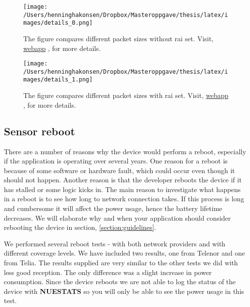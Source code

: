 \documentclass[USenglish]{ifimaster}  %
\begin{document}
\begin{figure}[H]
  \centering
  \texttt{[image: /Users/henninghakonsen/Dropbox/Masteroppgave/thesis/latex/images/details\_0.png]}
  \caption[Short-term test - packet size comparison without \acrshort{rai}]{The figure compares different packet sizes without \acrshort{rai} set. Visit, \href{http://158.39.77.97:9000/\#/results/UiO\_TELIA\_long\_term\_2018-03-22\_0x0\_30\_20}{webapp} \cite{online:result7}, for more details.}
  \label{figure:details_0}
\end{figure}

\begin{figure}[H]
  \centering
  \texttt{[image: /Users/henninghakonsen/Dropbox/Masteroppgave/thesis/latex/images/details\_1.png]}
  \caption[Short-term test - packet size comparison with \acrshort{rai}]{The figure compares different packet sizes with \acrshort{rai} set. Visit, \href{http://158.39.77.97:9000/\#/results/UiO\_TELIA\_long\_term\_2018-03-22\_0x2\_30\_20}{webapp} \cite{online:result8}, for more details.}
  \label{figure:details_1}
\end{figure}

\subsection{Sensor reboot} \label{ssection:reboottest}
There are a number of reasons why the device would perform a reboot, especially if the application is operating over several years. One reason for a reboot is because of some software or hardware fault, which could occur even though it should not happen. Another reason is that the developer reboots the device if it has stalled or some logic kicks in. The main reason to investigate what happens in a reboot is to see how long to network connection takes. If this process is long and cumbersome it will affect the power usage, hence the battery lifetime decreases. We will elaborate why and when your application should consider rebooting the device in section, \vref{section:guidelines}.

We performed several reboot tests - with both network providers and with different coverage levels. We have included two results, one from Telenor and one from Telia. The results supplied are very similar to the other tests we did with less good reception. The only difference was a slight increase in power consumption.
Since the device reboots we are not able to log the status of the device with \textbf{NUESTATS} so you will only be able to see the power usage in this test.
\end{document}

